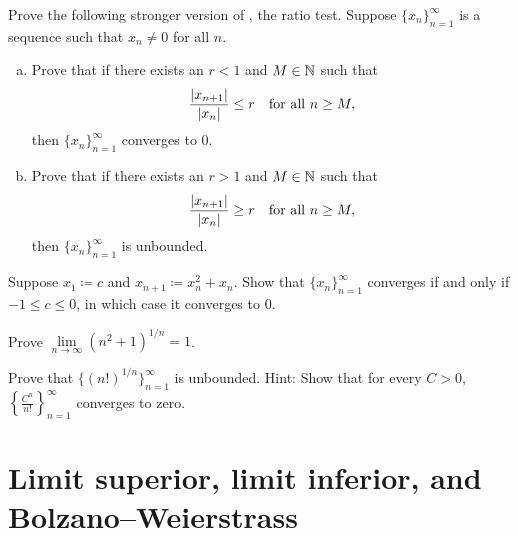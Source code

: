 \begin{samepage}
\begin{exercise}[Easy] \label{exercise:strongerratiotest1}
Prove the following stronger version of , the ratio
test.  
Suppose $\{ x_n \}_{n=1}^\infty$ is a sequence such that $x_n \not= 0$ for all
$n$.
\begin{enumerate}[a)]
\item
Prove that if there exists an $r < 1$ and $M \in {\mathbb{N}}$ such that
\begin{equation*}
\frac{\left\lvert {x_{n+1}} \right\rvert}{\left\lvert {x_n} \right\rvert} \leq r \quad \text{for all } n \geq M,
\end{equation*}
then $\{ x_n \}_{n=1}^\infty$ converges to $0$.
\item
Prove that if there exists an $r > 1$ and $M \in {\mathbb{N}}$ such that
\begin{equation*}
\frac{\left\lvert {x_{n+1}} \right\rvert}{\left\lvert {x_n} \right\rvert} \geq r  \quad \text{for all } n \geq M,
\end{equation*}
then $\{ x_n \}_{n=1}^\infty$ is unbounded.
\end{enumerate}
\end{exercise}
\end{samepage}

\begin{exercise} \label{exercise:convergentinitialvalues}
Suppose $x_1 \coloneqq c$ and $x_{n+1} \coloneqq x_n^2+x_n$.
Show that $\{ x_n \}_{n=1}^\infty$ converges if and only if $-1 \leq c \leq 0$, in which
case it converges to 0.
\end{exercise}

\begin{exercise}
Prove $\lim\limits_{n \to \infty} {(n^2+1)}^{1/n} = 1$.
\end{exercise}

\begin{exercise}
Prove that $\bigl\{ {(n!)}^{1/n} \bigr\}_{n=1}^\infty$
is unbounded.
Hint: Show that for every $C > 0$, $\left\{ \frac{C^n}{n!}
\right\}_{n=1}^\infty$ converges to zero.
\end{exercise}


\sectionnewpage
\section{Limit superior, limit inferior, and Bolzano--Weierstrass}
\label{sec:bw}


